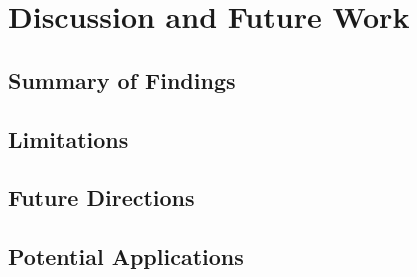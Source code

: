 \chapter{Discussion and Future Work}
\section{Summary of Findings}
\section{Limitations}
\section{Future Directions}
\section{Potential Applications}
